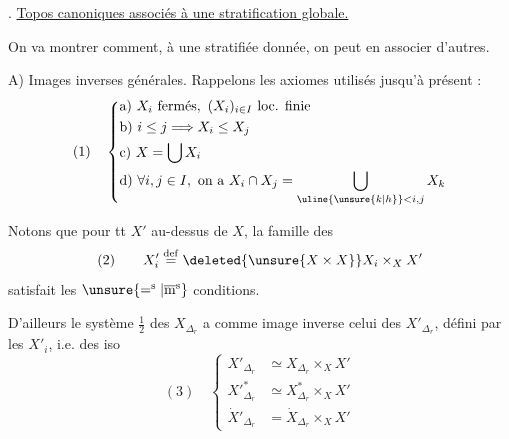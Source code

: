 . \uline{Topos canoniques associés à une stratification globale.}

On va montrer comment, à une  stratifiée donnée, on peut en associer d'autres.

A) Images inverses générales. Rappelons les axiomes utilisés jusqu'à présent :
\[
(1)\quad\left\{\begin{aligned}
&\text{a) }X_i\text{ fermés},\ (X_i)_{i\in I}\text{ loc. finie}\\
&\text{b) }i\leq j\Longrightarrow X_i\leq X_j\\
&\text{c) }X=\bigcup X_i\\
&\text{d) }\forall i,j\in I,\text{ on a }X_i\cap X_j=\bigcup_{\uline{\unsure{k|h}}<i,j}X_k
\end{aligned}\right.
\]

Notons que pour tt $X'$ au-dessus de $X$, la famille des
\[
(2)\qquad X'_i\overset{\mathrm{def}}=\deleted{\unsure{X\times X}}X_i\times_X X'
\]
satisfait les $\unsure{=^{\mathrm s}|\overline{\mathrm m}^{\mathrm s}}$ conditions.

D'ailleurs le système $\frac12$  des $X_{\Delta_r}$ a comme image inverse celui des $X'_{\Delta_r}$, défini par les $X'_i$,  i.e. des iso
\[
(3)\quad\left\{\begin{aligned}
X'_{\Delta_r}&\simeq X_{\Delta_r}\times_X X'\\
X'^{*}_{\Delta_r}&\simeq X^*_{\Delta_r}\times_X X'\\
\dot X'_{\Delta_r}&=\dot X_{\Delta_r}\times_X X'
\end{aligned}\right.
\]

